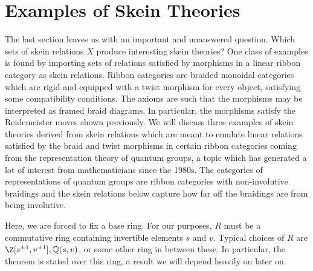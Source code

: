 \section{Examples of Skein Theories} \label{sec:skeintheories}

The last section leaves us with an important and unanswered question. Which sets of skein relations $X$ produce interesting skein theories? One class of examples is found by importing sets of relations satisfied by morphisms in a linear ribbon category as skein relations. Ribbon categories are braided monoidal categories which are rigid and equipped with a twist morphism for every object, satisfying some compatibility conditions. The axioms are such that the morphisms may be interpreted as framed braid diagrams. In particular, the morphisms satisfy the Reidemeister moves shown previously. We will discuss three examples of skein theories derived from skein relations which are meant to emulate linear relations satisfied by the braid and twist morphisms in certain ribbon categories coming from the representation theory of quantum groups, a topic which has generated a lot of interest from mathematicians since the 1980s. The categories of representations of quantum groups are ribbon categories with non-involutive braidings and the skein relations below capture how far off the braidings are from being involutive.  

Here, we are forced to fix a base ring. For our purposes, $R$ must be a commutative ring containing invertible elements $s$ and $v$. Typical choices of $R$ are $\Z[s^{\pm 1}, v^{\pm 1}], \Q(s, v)$, or some other ring in between these.  In particular, the theorem  is stated over this ring, a result we will depend heavily on later on. \\

